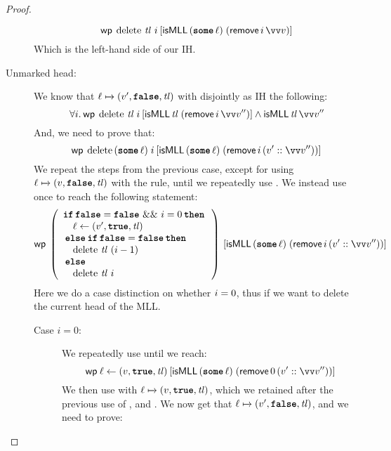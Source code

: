 \documentclass[thesis.tex]{subfiles}
\begin{document}
\begin{proof}
\begin{description}
\[                  \wpre{\MLLdelete\,\tl\ \iindex}{\isMLL\, (\Some \loc)\; (\textlog{remove}\, \iindex\, \vect{\val})}
              \]
              Which is the left-hand side of our IH.
        \item[Unmarked head:] We know that $\loc \fmapsto (\val', \False, \tl)$ with disjointly as IH the following:
              \[\All \iindex. \wpre{\MLLdelete\, \tl\; \iindex}{\isMLL\, \tl\; (\textlog{remove}\, \iindex\, \vect{\val}'')} \land \isMLL\, \tl\, \vect{\val}''\]
              And, we need to prove that:
              \[\wpre{\MLLdelete\, (\Some \loc)\; \iindex}{\isMLL\, (\Some \loc)\; (\textlog{remove}\, \iindex\, (\val' :: \vect{\val}''))}\]
              We repeat the steps from the previous case, except for using $\loc \fmapsto (\val, \False, \tl)$ with the  rule, until we repeatedly use . We instead use  once to reach the following statement:
              \[
                  \wpre{\left(
                      \begin{array}{l}
                              \If \False = \False\ \&\&\ \iindex = 0 then \\
                              \quad \loc \gets (\val', \True, \tl)        \\
                              \Else \If \False = \False then              \\
                              \quad \MLLdelete\,\tl\ (\iindex - 1)        \\
                              \Else                                       \\
                              \quad \MLLdelete\,\tl\ \iindex
                          \end{array}
                      \right)}{\isMLL\, (\Some \loc)\; (\textlog{remove}\, \iindex\, (\val' :: \vect{\val}''))}
              \]
              Here we do a case distinction on whether $i = 0$, thus if we want to delete the current head of the MLL.
              \begin{description}
                  \item[Case $i = 0$:] We repeatedly use  until we reach:
                        \[
                            \wpre{\loc \gets (\val, \True, \tl)}{\isMLL\, (\Some \loc)\; (\textlog{remove}\, 0\, (\val' :: \vect{\val}''))}
                        \]
                        We then use  with $\loc \fmapsto (\val, \True, \tl)$, which we retained after the previous use of , and . We now get that $\loc \fmapsto (\val', \False, \tl)$, and we need to prove:

\end{description}
\end{description}
\end{proof}
\end{document}
